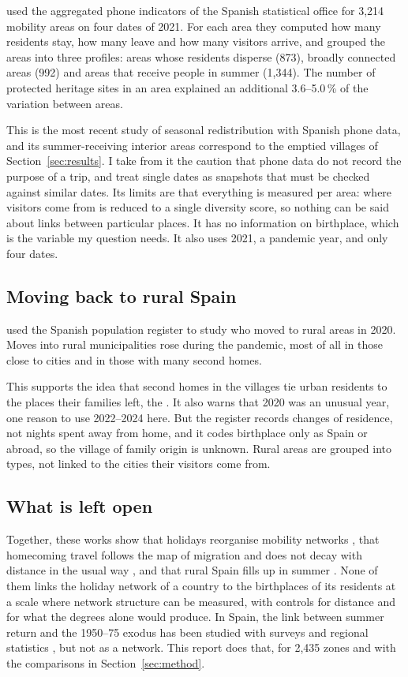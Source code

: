 \citet{garzon2026heritage} used the aggregated phone indicators of the Spanish statistical office for 3,214 mobility areas on four dates of 2021. For each area they computed how many residents stay, how many leave and how many visitors arrive, and grouped the areas into three profiles: areas whose residents disperse (873), broadly connected areas (992) and areas that receive people in summer (1,344). The number of protected heritage sites in an area explained an additional 3.6--5.0\,\% of the variation between areas.

This is the most recent study of seasonal redistribution with Spanish phone data, and its summer-receiving interior areas correspond to the emptied villages of Section~\ref{sec:results}. I take from it the caution that phone data do not record the purpose of a trip, and treat single dates as snapshots that must be checked against similar dates. Its limits are that everything is measured per area: where visitors come from is reduced to a single diversity score, so nothing can be said about links between particular places. It has no information on birthplace, which is the variable my question needs. It also uses 2021, a pandemic year, and only four dates.

\subsection{Moving back to rural Spain}

\citet{gonzalezleonardo2022rural} used the Spanish population register to study who moved to rural areas in 2020. Moves into rural municipalities rose during the pandemic, most of all in those close to cities and in those with many second homes.

This supports the idea that second homes in the villages tie urban residents to the places their families left, the . It also warns that 2020 was an unusual year, one reason to use 2022--2024 here. But the register records changes of residence, not nights spent away from home, and it codes birthplace only as Spain or abroad, so the village of family origin is unknown. Rural areas are grouped into types, not linked to the cities their visitors come from.

\subsection{What is left open}

Together, these works show that holidays reorganise mobility networks \citep{wesolowski2017seasonal}, that homecoming travel follows the map of migration \citep{li2016spring} and does not decay with distance in the usual way \citep{luan2024different}, and that rural Spain fills up in summer \citep{garzon2026heritage,gonzalezleonardo2022rural}. None of them links the holiday network of a country to the birthplaces of its residents at a scale where network structure can be measured, with controls for distance and for what the degrees alone would produce. In Spain, the link between summer return and the 1950--75 exodus has been studied with surveys and regional statistics \citep{garciagonzalez2024retorno}, but not as a network. This report does that, for 2,435 zones and with the comparisons in Section~\ref{sec:method}.
